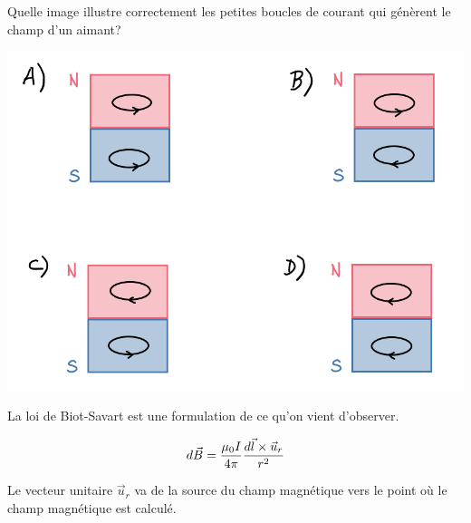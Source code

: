 \begin{diapobox}
  
  Quelle image illustre correctement les petites boucles de courant qui
  génèrent le champ d'un aimant?

  \begin{center}
    \includegraphics[scale=0.3]{08-champ-magnetique/figures/aimant_boucle.png}
  \end{center}

\end{diapobox}


\begin{fondamentalbox}
  La loi de Biot-Savart est une formulation de ce qu'on vient
  d'observer.

  $$d\vec{B} = \frac{\mu_0 I}{4\pi} \frac{d\vec{l} \times \vec{u}_r}{r^2} $$
  
  Le vecteur unitaire $\vec{u}_r$ va de la source du champ magnétique vers le
  point où le champ magnétique est calculé.
\end{fondamentalbox}

